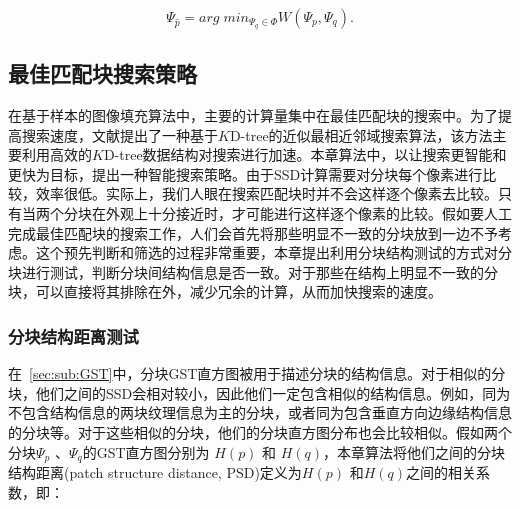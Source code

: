  $$\Psi_{\hat{p}}=arg\;min_{\Psi_q \in \Phi}{W(\Psi_p,\Psi_q)}.$$


 \subsection{最佳匹配块搜索策略}
 在基于样本的图像填充算法中，主要的计算量集中在最佳匹配块的搜索中。为了提高搜索速度，文献\cite{kwokFast}提出了一种基于$K$D-tree的近似最相近邻域搜索算法，该方法主要利用高效的$K$D-tree数据结构对搜索进行加速。本章算法中，以让搜索更智能和更快为目标，提出一种智能搜索策略。由于SSD计算需要对分块每个像素进行比较，效率很低。实际上，我们人眼在搜索匹配块时并不会这样逐个像素去比较。只有当两个分块在外观上十分接近时，才可能进行这样逐个像素的比较。假如要人工完成最佳匹配块的搜索工作，人们会首先将那些明显不一致的分块放到一边不予考虑。这个预先判断和筛选的过程非常重要，本章提出利用分块结构测试的方式对分块进行测试，判断分块间结构信息是否一致。对于那些在结构上明显不一致的分块，可以直接将其排除在外，减少冗余的计算，从而加快搜索的速度。
 \subsubsection{分块结构距离测试}
 \label{sec:sub:PST}
 在~\ref{sec:sub:GST}中，分块GST直方图被用于描述分块的结构信息。对于相似的分块，他们之间的SSD会相对较小，因此他们一定包含相似的结构信息。例如，同为不包含结构信息的两块纹理信息为主的分块，或者同为包含垂直方向边缘结构信息的分块等。对于这些相似的分块，他们的分块直方图分布也会比较相似。假如两个分块\(\Psi_p\) 、\(\Psi_q\)的GST直方图分别为 \(H(p)\) 和 \(H(q)\)，本章算法将他们之间的分块结构距离(patch structure distance, PSD)定义为\(H(p)\) 和\(H(q)\)之间的相关系数，即：

